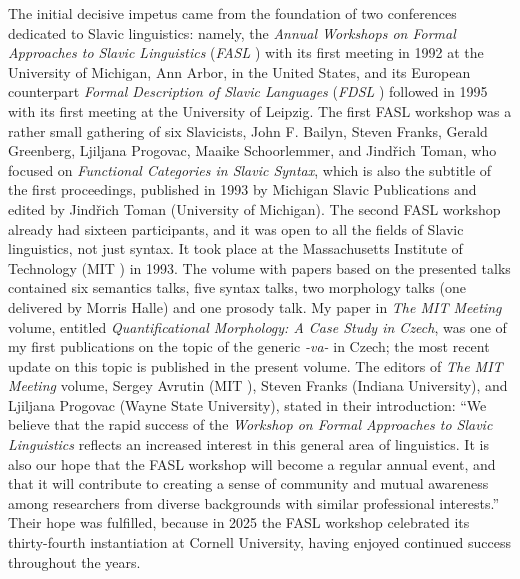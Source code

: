 \documentclass[output=paper]{langscibook}
\begin{document}
The initial decisive impetus came from the foundation of two conferences dedicated
to Slavic linguistics: namely, the \textit{Annual Workshops on Formal Approaches to Slavic Linguistics} (\textit{FASL%
}) with its first meeting in 1992 at the University of Michigan, 
Ann Arbor, in the United States, and its European counterpart 
\textit{%
Formal Description of Slavic Languages} (\textit{FDSL%
}) followed in 1995 with its first meeting at the University of Leipzig. 
The first FASL %
workshop was a rather small gathering of 
six Slavicists, John F. Bailyn, Steven Franks, Gerald Greenberg, Ljiljana Progovac, Maaike Schoorlemmer, and Jindřich Toman, 
who focused on \textit{Functional Categories in Slavic Syntax},
which is also the subtitle of the first proceedings, published in 1993 by Michigan Slavic Publications
and edited by Jindřich Toman (University of Michigan).
The second FASL %
workshop already had sixteen participants, and it was open to all the fields of Slavic linguistics, not just syntax. It took place at the Massachusetts
Institute of Technology (MIT%
) in 1993. The volume with papers based on the 
presented talks 
contained six semantics talks, five syntax talks, two morphology talks
(one delivered by Morris Halle) and one prosody talk. 
My paper in \textit{The MIT %
Meeting} volume, entitled 
\textit{Quantificational Morphology: A Case Study in Czech}, was one
of my first publications on the topic of the generic \textit{-va-} in Czech; the most recent update on this topic is published in the present volume. The editors of \textit{The MIT %
Meeting} volume, Sergey Avrutin (MIT%
), Steven Franks (Indiana University), and Ljiljana Progovac (Wayne State University), stated in their introduction: ``We believe that the rapid success of the \textit{Workshop on Formal Approaches to Slavic Linguistics} reflects an increased interest in this general area of linguistics. It is also our hope that the FASL %
workshop will become a regular annual event, and that it will contribute to creating a sense of community and mutual awareness
among researchers from diverse backgrounds with similar professional interests.''
Their hope was fulfilled, because in 2025 the FASL %
workshop celebrated its thirty-fourth instantiation 
at Cornell University, having enjoyed continued success throughout the years.
\end{document}
